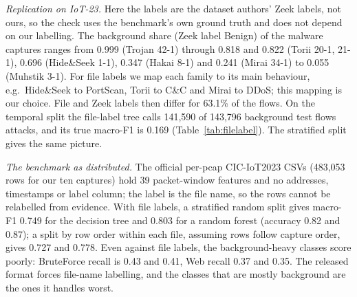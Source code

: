 \emph{Replication on IoT-23.} Here the labels are the dataset authors' Zeek labels, not ours, so the check uses the benchmark's own ground truth and does not depend on our labelling. The background share (Zeek label Benign) of the malware captures ranges from 0.999 (Trojan 42-1) through 0.818 and 0.822 (Torii 20-1, 21-1), 0.696 (Hide\&Seek 1-1), 0.347 (Hakai 8-1) and 0.241 (Mirai 34-1) to 0.055 (Muhstik 3-1). For file labels we map each family to its main behaviour, e.g.\ Hide\&Seek to PortScan, Torii to C\&C and Mirai to DDoS; this mapping is our choice. File and Zeek labels then differ for 63.1\% of the flows. On the temporal split the file-label tree calls 141,590 of 143,796 background test flows attacks, and its true macro-F1 is 0.169 (Table~\ref{tab:filelabel}). The stratified split gives the same picture.

\emph{The benchmark as distributed.} The official per-pcap CIC-IoT2023 CSVs (483,053 rows for our ten captures) hold 39 packet-window features and no addresses, timestamps or label column; the label is the file name, so the rows cannot be relabelled from evidence. With file labels, a stratified random split gives macro-F1 0.749 for the decision tree and 0.803 for a random forest (accuracy 0.82 and 0.87); a split by row order within each file, assuming rows follow capture order, gives 0.727 and 0.778. Even against file labels, the background-heavy classes score poorly: BruteForce recall is 0.43 and 0.41, Web recall 0.37 and 0.35. The released format forces file-name labelling, and the classes that are mostly background are the ones it handles worst.
